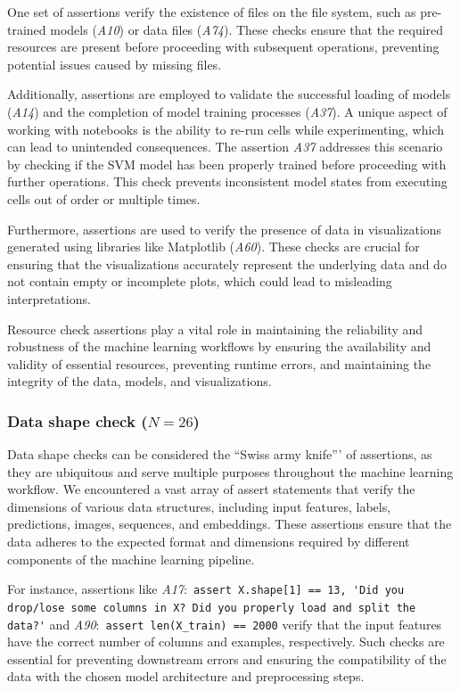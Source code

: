 One set of assertions verify the existence of files on the file system, such as pre-trained models (\emph{A10}) or data files (\emph{A74}). These checks ensure that the required resources are present before proceeding with subsequent operations, preventing potential issues caused by missing files.

Additionally, assertions are employed to validate the successful loading of models (\emph{A14}) and the completion of model training processes (\emph{A37}). A unique aspect of working with notebooks is the ability to re-run cells while experimenting, which can lead to unintended consequences. The assertion \emph{A37} addresses this scenario by checking if the SVM model has been properly trained before proceeding with further operations. This check prevents inconsistent model states from executing cells out of order or multiple times.

Furthermore, assertions are used to verify the presence of data in visualizations generated using libraries like Matplotlib (\emph{A60}). These checks are crucial for ensuring that the visualizations accurately represent the underlying data and do not contain empty or incomplete plots, which could lead to misleading interpretations.

Resource check assertions play a vital role in maintaining the reliability and robustness of the machine learning workflows by ensuring the availability and validity of essential resources, preventing runtime errors, and maintaining the integrity of the data, models, and visualizations.

\subsubsection{Data shape check ($N = 26$)}

Data shape checks can be considered the ``Swiss army knife''' of assertions, as they are ubiquitous and serve multiple purposes throughout the machine learning workflow. We encountered a vast array of assert statements that verify the dimensions of various data structures, including input features, labels, predictions, images, sequences, and embeddings. These assertions ensure that the data adheres to the expected format and dimensions required by different components of the machine learning pipeline.

For instance, assertions like \emph{A17}:~\lstinline{assert X.shape[1] == 13, 'Did you drop/lose some columns in X? Did you properly load and split the data?'} and \emph{A90}:~\lstinline{assert len(X_train) == 2000} verify that the input features have the correct number of columns and examples, respectively. Such checks are essential for preventing downstream errors and ensuring the compatibility of the data with the chosen model architecture and preprocessing steps.

